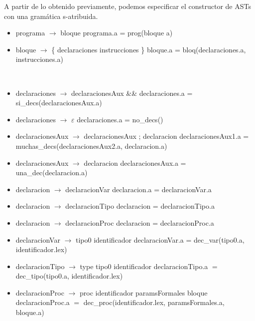 \documentclass[11pt]{article}
\begin{document}
    A partir de lo obtenido previamente, podemos especificar el constructor de ASTs con una gramática s-atribuida.

        \begin{itemize}
            \item programa $\rightarrow$ bloque
                \subitem programa.a = prog(bloque a)
            \item bloque $\rightarrow$ \{ declaraciones instrucciones \}
                \subitem bloque.a = bloq(declaraciones.a, instrucciones.a)
        \end{itemize}
        \
        \begin{itemize}
            \item declaraciones $\rightarrow$ declaracionesAux \&\&
                \subitem declaraciones.a = si\_decs(declaracionesAux.a)
            \item declaraciones $\rightarrow$ $\varepsilon$
                \subitem declaraciones.a = no\_decs()
            \item declaracionesAux $\rightarrow$ declaracionesAux ; declaracion 
                \subitem declaracionesAux1.a = muchas\_decs(declaracionesAux2.a, declaracion.a)
            \item declaracionesAux $\rightarrow$ declaracion  
                \subitem declaracionesAux.a = una\_dec(declaracion.a)                                         
            \item declaracion $\rightarrow$ declaracionVar
                \subitem declaracion.a = declaracionVar.a
            \item declaracion $\rightarrow$ declaracionTipo
                \subitem declaracion = declaracionTipo.a
            \item declaracion $\rightarrow$ declaracionProc
                \subitem declaracion = declaracionProc.a
            \item declaracionVar $\rightarrow$ tipo0 identificador
                \subitem declaracionVar.a = dec\_var(tipo0.a, identificador.lex)
            \item declaracionTipo $\rightarrow$ type tipo0 identificador
                \subitem declaracionTipo.a $=$ dec\_tipo(tipo0.a, identificador.lex)
            \item declaracionProc $\rightarrow$ proc identificador paramsFormales bloque
                \subitem declaracionProc.a $=$ dec\_proc(identificador.lex, paramsFormales.a, bloque.a)
        \end{itemize}
\end{document}
